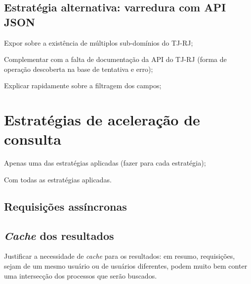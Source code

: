 \subsection{Estratégia alternativa: varredura com API JSON}

\begin{todolist}
    \item Expor sobre a existência de múltiplos sub-domínios do TJ-RJ;
    \item Complementar com a falta de documentação da API do TJ-RJ (forma de
          operação descoberta na base de tentativa e erro);
    \item Explicar rapidamente sobre a filtragem dos campos;
\end{todolist}

\section{Estratégias de aceleração de consulta}


\begin{todolist}
    \item Apenas uma das estratégias aplicadas (fazer para cada estratégia);
    \item Com todas as estratégias aplicadas.
\end{todolist}

\subsection{Requisições assíncronas}

\subsection{\textit{Cache} dos resultados}

\begin{todolist}
    \item Justificar a necessidade de \textit{cache} para os resultados: em
          resumo, requisições, sejam de um mesmo usuário ou de usuários
          diferentes, podem muito bem conter uma intersecção dos processos que
          serão buscados.
\end{todolist}
